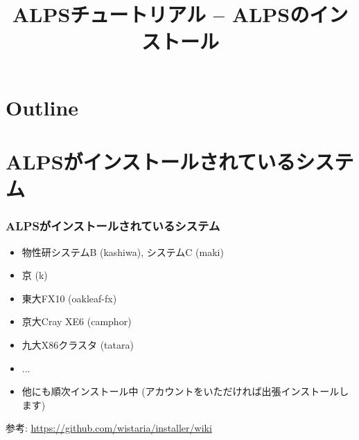 \title{ALPSチュートリアル -- ALPSのインストール}



\begin{frame}
  \titlepage
\end{frame}

\section*{Outline}
\begin{frame}
  \tableofcontents
\end{frame}

\section{ALPSがインストールされているシステム}
\begin{frame}[fragile]
  \frametitle{ALPSがインストールされているシステム}
  \begin{itemize}
  \item 物性研システムB (kashiwa), システムC (maki)
  \item 京 (k)
  \item 東大FX10 (oakleaf-fx)
  \item 京大Cray XE6 (camphor)
  \item 九大X86クラスタ (tatara)
  \item ...
  \item 他にも順次インストール中 (アカウントをいただければ出張インストールします)
  \end{itemize}
\begin{semiverbatim}
参考: {\footnotesize \url{https://github.com/wistaria/installer/wiki}}
\end{semiverbatim}
\end{frame}

